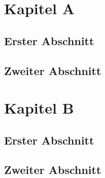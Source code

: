 \documentclass[twoside]{ausarbeitung}
\begin{document}
\chapter{Kapitel A}


\blindtext

\section{Erster Abschnitt}

\par\blindtext
\par\blindtext

\section{Zweiter Abschnitt}

\par\blindtext
\par\blindtext
\par\blindtext
\par\blindtext
\par\blindtext


\chapter{Kapitel B}

\par\blindtext
\par\blindtext

\section{Erster Abschnitt}

\par\blindtext
\par\blindtext

\section{Zweiter Abschnitt}
\end{document}
